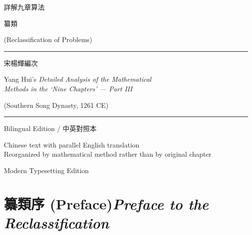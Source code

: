 \documentclass[10pt,a4paper]{article}
\newcommand{\shortline}{\noindent\rule{0.5\textwidth}{0.4pt}\par}
\newcommand{\bilingualsection}[2]{%
  \section{#1\hfill\textnormal{\small\textit{#2}}}
}
\begin{document}
\begin{titlepage}
\centering
\vspace*{2.5cm}

{\fontsize{32}{40}\selectfont\color{titlecolor} 詳解九章算法}

\vspace{1cm}

{\fontsize{22}{28}\selectfont\color{sectioncolor} 纂類}

\vspace{0.4cm}

{\large\color{prefacecolor} (Reclassification of Problems)}

\vspace{1.5cm}

\shortline

\vspace{0.8cm}

{\LARGE 宋\quad 楊輝\quad 編次}

\vspace{0.4cm}

{\large Yang Hui's \textit{Detailed Analysis of the Mathematical\\[0.3em]
Methods in the `Nine Chapters' --- Part III}}

\vspace{0.4cm}

{\normalsize (Southern Song Dynasty, 1261 CE)}

\vspace{1.5cm}

\shortline

\vspace{0.8cm}

{\normalsize Bilingual Edition / 中英對照本}

\vspace{0.5cm}

{\small Chinese text with parallel English translation\\
Reorganized by mathematical method rather than by original chapter}

\vfill

{\small Modern Typesetting Edition}

\end{titlepage}

\tableofcontents
\newpage

\bilingualsection{纂類序 (Preface)}{Preface to the Reclassification}
\end{document}
